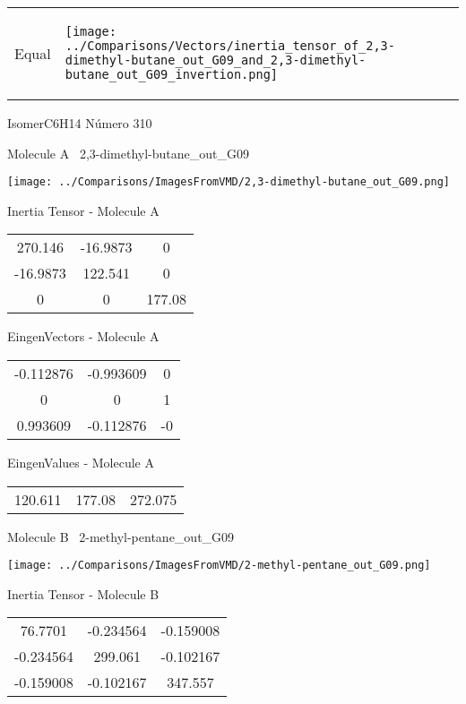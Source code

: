 \vtab[-5mm]
\begin{tabular}{*{2}{m{}}}
\begin{center}
\textcolor{NavyBlue}{\Large Equal}
\end{center}
&
\begin{center}
\texttt{[image: ../Comparisons/Vectors/inertia\_tensor\_of\_2,3-dimethyl-butane\_out\_G09\_and\_2,3-dimethyl-butane\_out\_G09\_invertion.png]}
\end{center}
\end{tabular}

 \newpage

\vtab[-3cm]
\begin{center}
{\large IsomerC6H14 \tab Número 310}
\end{center}
\begin{multicols}{2}
\begin{center}

Molecule A \
2,3-dimethyl-butane\_out\_G09

\texttt{[image: ../Comparisons/ImagesFromVMD/2,3-dimethyl-butane\_out\_G09.png]}

Inertia Tensor - Molecule A \\
\begin{tabular}{|c c c|}
270.146	 & 	-16.9873	 & 	0	 \\
-16.9873	 & 	122.541	 & 	0	 \\
0	 & 	0	 & 	177.08
\end{tabular}

\vtab
 EingenVectors - Molecule A     \\
\begin{tabular}{|c c c|}
-0.112876	 & 	-0.993609	 & 	0	 \\
0	 & 	0	 & 	1	 \\
0.993609	 & 	-0.112876	 & 	-0
\end{tabular}

\vtab
 EingenValues - Molecule A     \\
\begin{tabular}{|c c c|}
120.611	 & 	177.08	 & 	272.075	 \\
\end{tabular}
\columnbreak

Molecule B \
2-methyl-pentane\_out\_G09

\texttt{[image: ../Comparisons/ImagesFromVMD/2-methyl-pentane\_out\_G09.png]}

Inertia Tensor - Molecule B \\
\begin{tabular}{|c c c|}
76.7701	 & 	-0.234564	 & 	-0.159008	 \\
-0.234564	 & 	299.061	 & 	-0.102167	 \\
-0.159008	 & 	-0.102167	 & 	347.557
\end{tabular}


\end{center}
\end{multicols}

